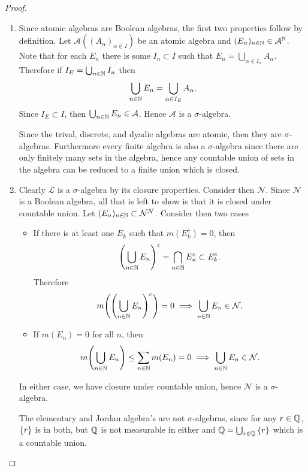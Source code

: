 \documentclass[hw_all.tex]{subfiles}
\begin{document}
\begin{proof}
    \begin{enumerate}
        \item
            Since atomic algebras are Boolean algebras, the first two properties follow by definition. Let $\mathcal{A}((A_{\alpha})_{\alpha \in I})$ be an atomic algebra and $(E_n)_{n \in \mathbb{N}} \in \mathcal{A}^{\mathbb{N}}$. Note that for each $E_n$ there is some $I_n \subset I$ such that $E_n = \bigcup_{\alpha \in I_n} A_{\alpha}$. Therefore if $I_E = \bigcup_{n \in \mathbb{N}} I_n$ then
            \[
                \bigcup_{n \in \mathbb{N}} E_n = \bigcup_{\alpha \in I_E} A_{\alpha}
            .\]
            Since $I_E \subset I$, then $\bigcup_{n \in \mathbb{N}} E_n \in \mathcal{A}$. Hence $\mathcal{A}$ is a $\sigma$-algebra.

            Since the trival, discrete, and dyadic algebras are atomic, then they are $\sigma$-algebras. Furthermore every finite algebra is also a $\sigma$-algebra since there are only finitely many sets in the algebra, hence any countable union of sets in the algebra can be reduced to a finite union which is closed.

        \item 
            Clearly $\mathcal{L}$ is a $\sigma$-algebra by its closure properties. Consider then $\mathcal{N}$. Since $\mathcal{N}$ is a Boolean algebra, all that is left to show is that it is closed under countable union. Let $(E_n)_{n \in \mathbb{N}} \subset \mathcal{N}^\mathcal{N}$. Consider then two cases
            \begin{itemize}
                \item If there is at least one $E_k$ such that $m(E_k^c) = 0$, then
                    \[
                        \qty(\bigcup_{n \in \mathbb{N}} E_n)^c = \bigcap_{n \in \mathbb{N}} E_n^c \subset E_k^c
                    .\]
                    Therefore
                    \[
                        m\qty(\qty(\bigcup_{n \in \mathbb{N}} E_n)^c) = 0 \implies \bigcup_{n \in \mathbb{N}} E_n \in \mathcal{N}
                    .\]

                \item If $m(E_n) = 0$ for all $n$, then
                    \[
                        m\qty(\bigcup_{n \in \mathbb{N}} E_n) \leq \sum_{n \in \mathbb{N}} m(E_n) = 0 \implies \bigcup_{n \in \mathbb{N}} E_n \in \mathcal{N}
                    .\]
            \end{itemize}
            In either case, we have closure under countable union, hence $\mathcal{N}$ is a $\sigma$-algebra.

            The elementary and Jordan algebra's are not $\sigma$-algebras, since for any $r \in \mathbb{Q}$, $\qty{r}$ is in both, but $\mathbb{Q}$ is not measurable in either and $\mathbb{Q} = \bigcup_{r \in \mathbb{Q}} \qty{r}$ which is a countable union.


\end{enumerate}
\end{proof}
\end{document}
